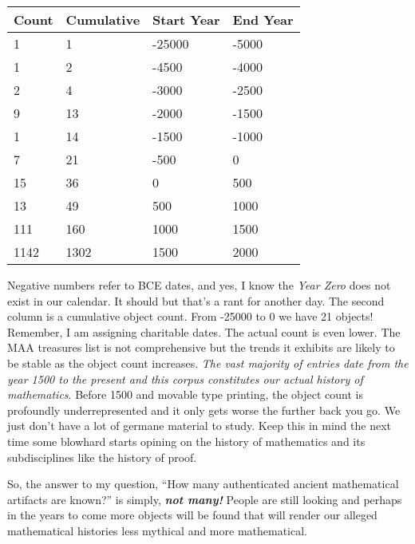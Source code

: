 \begin{longtable}[]{@{}llll@{}}
\toprule
Count & Cumulative & Start Year & End Year \\
\midrule
\endhead
1 & 1 & -25000 & -5000 \\
1 & 2 & -4500 & -4000 \\
2 & 4 & -3000 & -2500 \\
9 & 13 & -2000 & -1500 \\
1 & 14 & -1500 & -1000 \\
7 & 21 & -500 & 0 \\
15 & 36 & 0 & 500 \\
13 & 49 & 500 & 1000 \\
111 & 160 & 1000 & 1500 \\
1142 & 1302 & 1500 & 2000 \\
\bottomrule
\end{longtable}

Negative numbers refer to BCE dates, and yes, I know the \emph{Year
Zero} does not exist in our calendar. It should but that's a rant for
another day. The second column is a cumulative object count. From -25000
to 0 we have 21 objects! Remember, I am assigning charitable dates. The
actual count is even lower. The MAA treasures list is not comprehensive
but the trends it exhibits are likely to be stable as the object count
increases. \emph{The vast majority of entries date from the year 1500 to
the present and this corpus constitutes our actual history of
mathematics}. Before 1500 and movable type printing, the object count is
profoundly underrepresented and it only gets worse the further back you
go. We just don't have a lot of germane material to study. Keep this in
mind the next time some blowhard starts opining on the history of
mathematics and its subdisciplines like the history of proof.

So, the answer to my question, ``How many authenticated ancient
mathematical artifacts are known?'' is simply, \textbf{\emph{not many!}}
People are still looking and perhaps in the years to come more objects
will be found that will render our alleged mathematical histories less
mythical and more mathematical.


%

